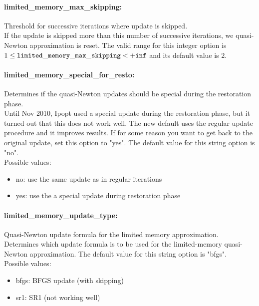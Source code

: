 \paragraph{limited\_memory\_max\_skipping:}\label{sec:limited_memory_max_skipping} Threshold for successive iterations where update is skipped. $\;$ \\
 If the update is skipped more than this number of
successive iterations, we quasi-Newton
approximation is reset. The valid range for this integer option is
$1 \le {\tt limited\_memory\_max\_skipping } <  {\tt +inf}$
and its default value is $2$.


\paragraph{limited\_memory\_special\_for\_resto:}\label{sec:limited_memory_special_for_resto} Determines if the quasi-Newton updates should be special during the restoration phase. $\;$ \\
 Until Nov 2010, Ipopt used a special update
during the restoration phase, but it turned out
that this does not work well.  The new default
uses the regular update procedure and it improves
results.  If for some reason you want to get back
to the original update, set this option to "yes".
The default value for this string option is "no".
\\ 
Possible values:
\begin{itemize}
   \item no: use the same update as in regular iterations
   \item yes: use the a special update during restoration
phase
\end{itemize}

\paragraph{limited\_memory\_update\_type:}\label{sec:limited_memory_update_type} Quasi-Newton update formula for the limited memory approximation. $\;$ \\
 Determines which update formula is to be used for
the limited-memory quasi-Newton approximation.
The default value for this string option is "bfgs".
\\ 
Possible values:
\begin{itemize}
   \item bfgs: BFGS update (with skipping)
   \item sr1: SR1 (not working well)
\end{itemize}

